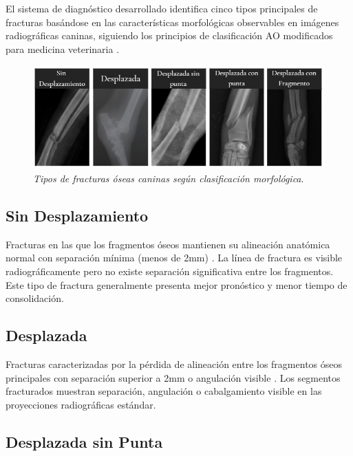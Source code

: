 {El sistema de diagnóstico desarrollado identifica cinco tipos principales de fracturas basándose en las características morfológicas observables en imágenes radiográficas caninas, siguiendo los principios de clasificación AO modificados para medicina veterinaria \cite{unger2024ao}.

\begin{figure}[H]
\leavevmode
\begin{minipage}{\textwidth}
\begin{center}
\includegraphics[width=1\textwidth]{./capitulo_02/figures/Tipos_de_Fracturas}
\caption{\textit{Tipos de fracturas óseas caninas según clasificación morfológica}. \label{fig:tipos_fracturas}}
\end{center}
\end{minipage}
\end{figure}

\subsection{Sin Desplazamiento}

Fracturas en las que los fragmentos óseos mantienen su alineación anatómica normal con separación mínima (menos de 2mm) \cite{piermattei2016handbook}. La línea de fractura es visible radiográficamente pero no existe separación significativa entre los fragmentos. Este tipo de fractura generalmente presenta mejor pronóstico y menor tiempo de consolidación.

\subsection{Desplazada}

Fracturas caracterizadas por la pérdida de alineación entre los fragmentos óseos principales con separación superior a 2mm o angulación visible \cite{fossum2021small}. Los segmentos fracturados muestran separación, angulación o cabalgamiento visible en las proyecciones radiográficas estándar.

\subsection{Desplazada sin Punta}

}
